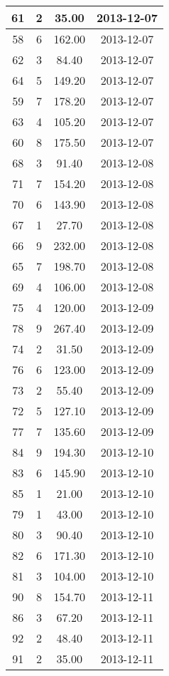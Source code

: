 \documentclass[a4paper,11pt]{article}
\begin{document}
\begin{longtable}{|c|c|c|c|}
	 61 &   2 &  35.00 & 2013-12-07\\ \hline
	 58 &   6 & 162.00 & 2013-12-07\\ \hline
	 62 &   3 &  84.40 & 2013-12-07\\ \hline
	 64 &   5 & 149.20 & 2013-12-07\\ \hline
	 59 &   7 & 178.20 & 2013-12-07\\ \hline
	 63 &   4 & 105.20 & 2013-12-07\\ \hline
	 60 &   8 & 175.50 & 2013-12-07\\ \hline
	 68 &   3 &  91.40 & 2013-12-08\\ \hline
	 71 &   7 & 154.20 & 2013-12-08\\ \hline
	 70 &   6 & 143.90 & 2013-12-08\\ \hline
	 67 &   1 &  27.70 & 2013-12-08\\ \hline
	 66 &   9 & 232.00 & 2013-12-08\\ \hline
	 65 &   7 & 198.70 & 2013-12-08\\ \hline
	 69 &   4 & 106.00 & 2013-12-08\\ \hline
	 75 &   4 & 120.00 & 2013-12-09\\ \hline
	 78 &   9 & 267.40 & 2013-12-09\\ \hline
	 74 &   2 &  31.50 & 2013-12-09\\ \hline
	 76 &   6 & 123.00 & 2013-12-09\\ \hline
	 73 &   2 &  55.40 & 2013-12-09\\ \hline
	 72 &   5 & 127.10 & 2013-12-09\\ \hline
	 77 &   7 & 135.60 & 2013-12-09\\ \hline
	 84 &   9 & 194.30 & 2013-12-10\\ \hline
	 83 &   6 & 145.90 & 2013-12-10\\ \hline
	 85 &   1 &  21.00 & 2013-12-10\\ \hline
	 79 &   1 &  43.00 & 2013-12-10\\ \hline
	 80 &   3 &  90.40 & 2013-12-10\\ \hline
	 82 &   6 & 171.30 & 2013-12-10\\ \hline
	 81 &   3 & 104.00 & 2013-12-10\\ \hline
	 90 &   8 & 154.70 & 2013-12-11\\ \hline
	 86 &   3 &  67.20 & 2013-12-11\\ \hline
	 92 &   2 &  48.40 & 2013-12-11\\ \hline
	 91 &   2 &  35.00 & 2013-12-11\\ \hline

\end{longtable}
\end{document}
